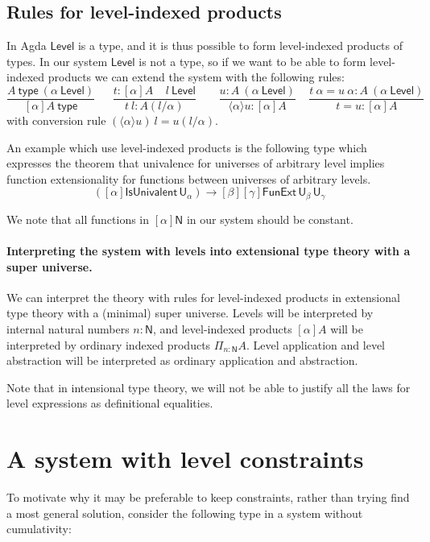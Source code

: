 \documentclass[11pt,a4paper]{article}
\newcommand{\lam}[2]{{\langle}#1{\rangle}#2}
\def\NN{\mathsf{N}}
\def\UU{\mathsf{U}}
\def\Level{\mathsf{Level}}
\newcommand{\type}{\mathsf{type}}
\begin{document}
\subsection*{Rules for level-indexed products}

In Agda $\Level$ is a type, and it is thus possible to form level-indexed products of types. In our system $\Level$ is not a type, so if we want to be able to form level-indexed products we can extend the system with the following rules:
$$
\frac{A~\type~(\alpha~\Level)}{[\alpha]A~\type}~~~~~~~
\frac{t:[\alpha]A~~~~~l~\Level}
     {t~l:A(l/\alpha)}~~~~~~~~~
\frac{u:A~(\alpha~\Level)}{\lam{\alpha}{u}: [\alpha]A}~~~~~
\frac{t~\alpha = u~\alpha:A~(\alpha~\Level)}{t = u:[\alpha]A}
$$
with conversion rule $(\lam{\alpha}{u})~l = u(l/\alpha)$.

An example which use level-indexed products is the following type which  expresses the theorem that univalence for universes of arbitrary level implies function extensionality for functions between universes of arbitrary levels.
$$
([\alpha]\mathsf{IsUnivalent}\, \UU_\alpha)
\to [\beta][\gamma] \mathsf{FunExt}\, \UU_\beta\, \UU_\gamma
$$   
               
We note that all functions in $[\alpha]\NN$ in our system
should be constant. 

\paragraph{Interpreting the system with levels into extensional type theory with a super universe.} We can interpret the theory with rules for level-indexed products in extensional type theory with a (minimal) super universe. Levels will be interpreted by internal natural numbers $n : \NN$, and level-indexed products $[\alpha]A$ will be interpreted by ordinary indexed products $\Pi_{n : \NN}A$. Level application and level abstraction will be interpreted as ordinary application and abstraction.

Note that in intensional type theory, we will not be able to justify all the laws for level expressions as definitional equalities.

\section{A system with level constraints}\label{constraints}

To motivate why it may be preferable to keep constraints, rather than trying find a most general solution, consider the following type in a system without cumulativity:
\end{document}
